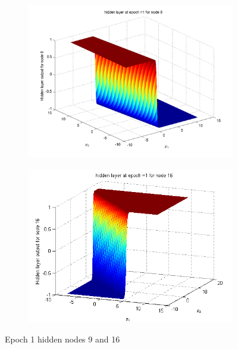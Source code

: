 \documentclass{article}
\begin{document}
\begin{figure}
\begin{subfigure}{.5\textwidth}
  \centering
  \includegraphics[width=.8\linewidth]{Classification/overlapping/h1_9}
 
\end{subfigure}%
\begin{subfigure}{.5\textwidth}
  \centering
  \includegraphics[width=.8\linewidth]{Classification/overlapping/h1_16}
  \end{subfigure}
\caption{Epoch 1 hidden nodes 9 and 16}
\end{figure}
\end{document}
